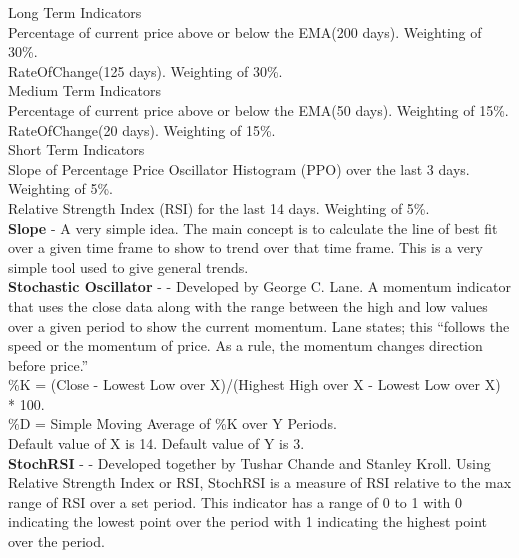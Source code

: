 \documentclass[conference]{IEEEtran}
\begin{document}
\noindent
Long Term Indicators\\
Percentage of current price above or below the EMA(200 days). Weighting of 30\%. \\
RateOfChange(125 days). Weighting of 30\%. \\

\noindent
Medium Term Indicators\\
Percentage of current price above or below the EMA(50 days). Weighting of 15\%. \\
RateOfChange(20 days). Weighting of 15\%. \\

\noindent
Short Term Indicators\\
Slope of Percentage Price Oscillator Histogram (PPO) over the last 3 days. Weighting of 5\%. \\
Relative Strength Index (RSI) for the last 14 days. Weighting of 5\%. \\

\iffalse
[]
\fi

\noindent
\textbf{Slope} - A very simple idea. The main concept is to calculate the line of best fit over a given time frame to show to trend over that time frame. This is a very simple tool used to give general trends.\\

\iffalse
[]
\fi

\noindent
\textbf{Stochastic Oscillator} - \cite{Murphy1999} - Developed by George C. Lane. A momentum indicator that uses the close data along with the range between the high and low values over a given period to show the current momentum. Lane states; this ``follows the speed or the momentum of price. As a rule, the momentum changes direction before price.'' \\

\noindent
\%K = (Close - Lowest Low over X)/(Highest High over X - Lowest Low over X) * 100.\\
\%D = Simple Moving Average of \%K over Y Periods. \\
Default value of X is 14. Default value of Y is 3.\\

\iffalse
[]
\fi

\noindent
\textbf{StochRSI} - \cite{Chande1994} - Developed together by Tushar Chande and Stanley Kroll. Using Relative Strength Index or RSI, StochRSI is a measure of RSI relative to the max range of RSI over a set period. This indicator has a range of 0 to 1 with 0 indicating the lowest point over the period with 1 indicating the highest point over the period.\\
\end{document}
